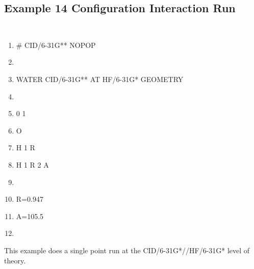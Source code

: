 \subsection{\sf Example 14 Configuration Interaction Run}
{\tt 
\begin{enumerate}
\item   \# CID/6-31G** NOPOP
\item 
\item   WATER CID/6-31G**  AT HF/6-31G* GEOMETRY
\item 
\item   0 1
\item   O
\item   H 1 R
\item   H 1 R 2 A
\item 
\item   R=0.947
\item   A=105.5
\item 
\end{enumerate}
}
This example does a single point run at the CID/6-31G*//HF/6-31G*
level of theory.
